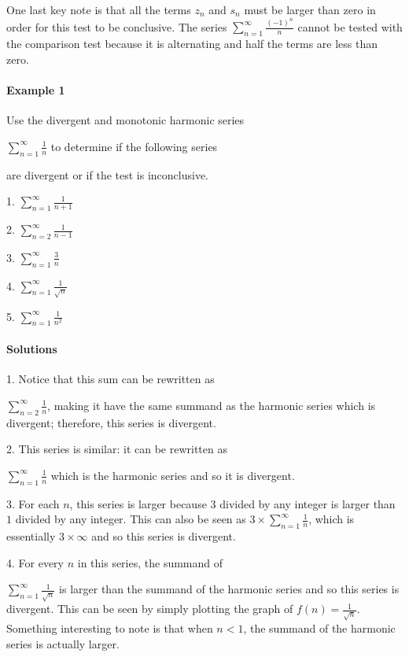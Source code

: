 One last key note is that all the terms $z _n$ and $s _n$ must be larger than zero in order for this test to be conclusive. The series $\sum _{n=1}^{\infty}{\frac{(-1)^n}{n}}$ cannot be tested with the comparison test because it is alternating and half the terms are less than zero.



\paragraph{Example 1}



Use the divergent and monotonic harmonic series

$\sum _{n=1}^{\infty}{\frac{1}{n}}$ to determine if the following series

are divergent or if the test is inconclusive.



1.  $\sum _{n=1}^{\infty}{\frac{1}{n+1}}$

2.  $\sum _{n=2}^{\infty}{\frac{1}{n-1}}$

3.  $\sum _{n=1}^{\infty}{\frac{3}{n}}$

4.  $\sum _{n=1}^{\infty}{\frac{1}{\sqrt{n}}}$

5.  $\sum _{n=1}^{\infty}{\frac{1}{n^2}}$



\paragraph{Solutions}



1.  Notice that this sum can be rewritten as

    $\sum _{n=2}^{\infty}{\frac{1}{n}}$, making it have the same summand as the harmonic series which is divergent; therefore, this series is divergent.

2.  This series is similar: it can be rewritten as

    $\sum _{n=1}^{\infty}{\frac{1}{n}}$ which is the harmonic series and so it is divergent.

3.  For each $n$, this series is larger because $3$ divided by any integer is larger than $1$ divided by any integer. This can also be seen as $3 \times \sum _{n=1}^{\infty}{\frac{1}{n}}$, which is essentially $3 \times \infty$ and so this series is divergent.

4.  For every $n$ in this series, the summand of

    $\sum _{n=1}^{\infty}{\frac{1}{\sqrt{n}}}$ is larger than the summand     of the harmonic series and so this series is divergent. This can be     seen by simply plotting the graph of $f(n)=\frac{1}{\sqrt{n}}$. Something interesting to note is that when $n < 1$, the summand of     the harmonic series is actually larger.

